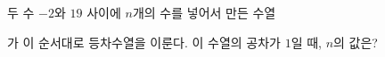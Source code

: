 두 수 $-2$와 $19$ 사이에 $n$개의 수를 넣어서 만든 수열\par\smallskip{}\par\smallskip\noindent 가 이 순서대로 등차수열을 이룬다. 이 수열의 공차가 $1$일 때, $n$의 값은?
